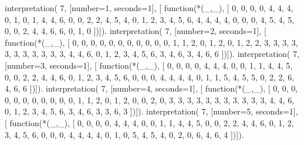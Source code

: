 interpretation( 7, [number=1, seconds=1], [
  function(*(_,_), [
     0, 0, 0, 0, 4, 4, 4,
     0, 1, 0, 1, 4, 4, 6,
     0, 0, 2, 2, 4, 5, 4,
     0, 1, 2, 3, 4, 5, 6,
     4, 4, 4, 4, 0, 0, 0,
     4, 5, 4, 5, 0, 0, 2,
     4, 4, 6, 6, 0, 1, 0 ])]).
interpretation( 7, [number=2, seconds=1], [
  function(*(_,_), [
     0, 0, 0, 0, 0, 0, 0,
     0, 0, 0, 0, 1, 1, 2,
     0, 1, 2, 0, 1, 2, 2,
     3, 3, 3, 3, 3, 3, 3,
     3, 3, 3, 3, 4, 4, 6,
     0, 1, 2, 3, 4, 5, 6,
     3, 4, 6, 3, 4, 6, 6 ])]).
interpretation( 7, [number=3, seconds=1], [
  function(*(_,_), [
     0, 0, 0, 0, 4, 4, 4,
     0, 0, 1, 1, 4, 4, 5,
     0, 0, 2, 2, 4, 4, 6,
     0, 1, 2, 3, 4, 5, 6,
     0, 0, 0, 4, 4, 4, 4,
     0, 1, 1, 5, 4, 5, 5,
     0, 2, 2, 6, 4, 6, 6 ])]).
interpretation( 7, [number=4, seconds=1], [
  function(*(_,_), [
     0, 0, 0, 0, 0, 0, 0,
     0, 0, 0, 0, 1, 1, 2,
     0, 1, 2, 0, 0, 2, 0,
     3, 3, 3, 3, 3, 3, 3,
     3, 3, 3, 3, 4, 4, 6,
     0, 1, 2, 3, 4, 5, 6,
     3, 4, 6, 3, 3, 6, 3 ])]).
interpretation( 7, [number=5, seconds=1], [
  function(*(_,_), [
     0, 0, 0, 0, 4, 4, 4,
     0, 0, 1, 1, 4, 4, 5,
     0, 0, 2, 2, 4, 4, 6,
     0, 1, 2, 3, 4, 5, 6,
     0, 0, 0, 4, 4, 4, 4,
     0, 1, 0, 5, 4, 5, 4,
     0, 2, 0, 6, 4, 6, 4 ])]).
